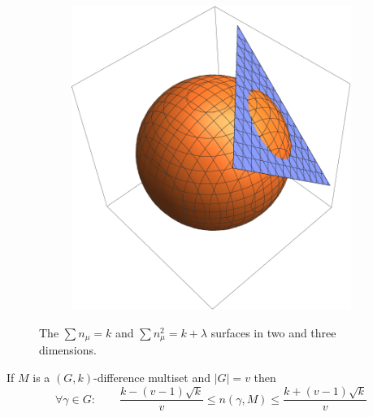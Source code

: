\begin{figure}
\begin{subfigure}[b]{0.5\textwidth}
            \includegraphics[width=\textwidth]{assets/surfacesIn3D}
        \end{subfigure}
        \caption{The $\sum {n_\mu} = k$ and $\sum n_\mu^2 = k + \lambda$ surfaces in two and three dimensions.}
        \label{general:figure:surfaces}
    \end{figure}
        
    \begin{theorem}
        \label{general:theorem:limits}
        If $M$ is a $(G,k)$-difference multiset and $|G|=v$ then
        \begin{equation}
            \forall \gamma \in G \colon\qquad \frac{k-(v-1)\sqrt k}{v} \leq n(\gamma,M) \leq \frac{k+(v-1)\sqrt k}{v}
        \end{equation}
    \end{theorem}
    
